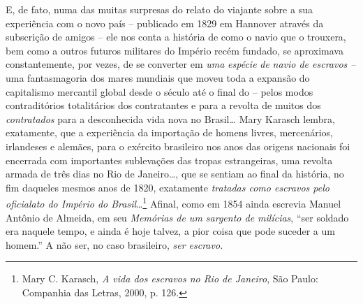 E, de fato, numa das muitas surpresas do relato do viajante sobre a sua
experiência com o novo país -- publicado em 1829 em Hannover através da
subscrição de amigos -- ele nos conta a história de como o navio que o
trouxera, bem como a outros futuros militares do Império recém fundado,
se aproximava constantemente, por vezes, de se converter em \emph{uma}
\emph{espécie} \emph{de} \emph{navio de escravos --} uma fantasmagoria
dos mares mundiais que moveu toda a expansão do capitalismo mercantil
global desde o século  até o final do  -- pelos modos
contraditórios totalitários dos contratantes e para a revolta de muitos
dos \emph{contratados} para a desconhecida vida nova no Brasil\emph{\ldots{}}
Mary Karasch lembra, exatamente, que a experiência da importação de
homens livres, mercenários, irlandeses e alemães, para o exército
brasileiro nos anos das origens nacionais foi encerrada com importantes
sublevações das tropas estrangeiras, uma revolta armada de três dias no
Rio de Janeiro\ldots{}, que se sentiam ao final da história, no fim daqueles
mesmos anos de 1820, exatamente \emph{tratadas como escravos pelo
oficialato do Império do Brasil}\ldots{}\footnote{Mary C. Karasch, \emph{A
  vida dos escravos no Rio de Janeiro}, São Paulo: Companhia das Letras,
  2000, p. 126.} Afinal, como em 1854 ainda escrevia Manuel Antônio de
Almeida, em seu \emph{Memórias de um sargento de milícias}, ``ser
soldado era naquele tempo, e ainda é hoje talvez, a pior coisa que pode
suceder a um homem.'' A não ser, no caso brasileiro, \emph{ser escravo.}

